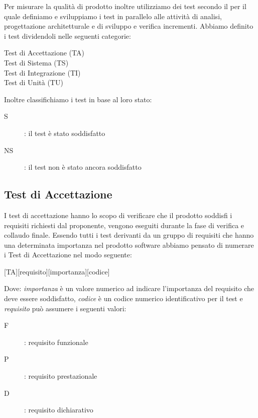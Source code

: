 \documentclass[../piano-di-qualifica.tex]{subfiles}
\begin{document}
\label{sub:test}
    Per misurare la qualità di prodotto inoltre utilizziamo dei test secondo il  per il quale definiamo e sviluppiamo i test in parallelo alle attività di analisi, progettazione architetturale e di sviluppo e verifica incrementi.
    Abbiamo definito i test dividendoli nelle seguenti categorie:
    \begin{description}
      \item [Test di Accettazione (TA)]
      \item [Test di Sistema (TS)]
      \item [Test di Integrazione (TI)]
      \item [Test di Unità (TU)]
    \end{description}
    Inoltre classifichiamo i test in base al loro stato:
      \begin{description}
        \item [S]: il test è stato soddisfatto
        \item [NS]: il test non è stato ancora soddisfatto
      \end{description}
  \subsection{Test di Accettazione}%
  \label{subs:accettazione}
      I test di accettazione hanno lo scopo di verificare che il prodotto soddisfi i requisiti richiesti dal proponente, vengono eseguiti durante la fase di verifica e collaudo finale.
      Essendo tutti i test derivanti da un gruppo di requisiti che hanno una determinata importanza nel prodotto software abbiamo pensato di numerare i Test di Accettazione nel modo seguente:
      \begin{center}
          [TA][requisito][importanza][codice]
      \end{center}
      Dove: \textit{importanza} è un valore numerico ad indicare l'importanza del requisito che deve essere soddisfatto, \textit{codice} è un codice numerico identificativo per il test e \textit{requisito} può assumere i seguenti valori:
      \begin{description}
        \item [F]: requisito funzionale
        \item [P]: requisito prestazionale
        \item [D]: requisito dichiarativo
      \end{description}
\end{document}
